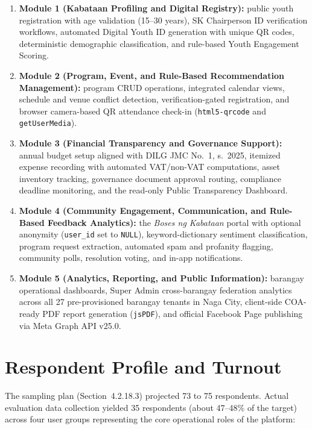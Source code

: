 \begin{enumerate}
    \item \textbf{Module 1 (Kabataan Profiling and Digital Registry):} public youth registration with age validation (15--30 years), SK Chairperson ID verification workflows, automated Digital Youth ID generation with unique QR codes, deterministic demographic classification, and rule-based Youth Engagement Scoring.
   \newpage
    \item \textbf{Module 2 (Program, Event, and Rule-Based Recommendation Management):} program CRUD operations, integrated calendar views, schedule and venue conflict detection, verification-gated registration, and browser camera-based QR attendance check-in (\texttt{html5-qrcode} and \texttt{getUserMedia}).
    \item \textbf{Module 3 (Financial Transparency and Governance Support):} annual budget setup aligned with DILG JMC No.~1, s.~2025, itemized expense recording with automated VAT/non-VAT computations, asset inventory tracking, governance document approval routing, compliance deadline monitoring, and the read-only Public Transparency Dashboard.
    \item \textbf{Module 4 (Community Engagement, Communication, and Rule-Based Feedback Analytics):} the \textit{Boses ng Kabataan} portal with optional anonymity (\texttt{user\_id} set to \texttt{NULL}), keyword-dictionary sentiment classification, program request extraction, automated spam and profanity flagging, community polls, resolution voting, and in-app notifications.
    \item \textbf{Module 5 (Analytics, Reporting, and Public Information):} barangay operational dashboards, Super Admin cross-barangay federation analytics across all 27 pre-provisioned barangay tenants in Naga City, client-side COA-ready PDF report generation (\texttt{jsPDF}), and official Facebook Page publishing via Meta Graph API v25.0.
\end{enumerate}
\vspace{5mm}

\section{Respondent Profile and Turnout}
\label{sec:respondent_profile_and_turnout}

\hspace*{\parindent}The sampling plan (Section~4.2.18.3) projected 73 to 75 respondents. Actual evaluation data collection yielded 35 respondents (about 47--48\% of the target) across four user groups representing the core operational roles of the platform:

